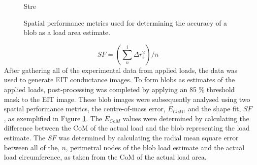 	\begin{figure}[H]Stre
		\centering
		\hspace{1cm}
		\vspace{0.2cm}
		\caption{Spatial performance metrics used for determining the accuracy of a blob as a load area estimate.}
		\label{fig:eg_spatial_metrics}
	\end{figure}
    \begin{equation}
        S\!F = \left( \sum^i_n \Delta r_i^2 \right) / n
        \label{eqn:sf}
    \end{equation}
	After gathering all of the experimental data from applied loads, the data was used to generate EIT conductance images. To form blobs as estimates of the applied loads, post-processing was completed by applying an 85 \% threshold mask to the EIT image. These blob images were subsequently analysed using two spatial performance metrics, the centre-of-mass error, $E_{CoM}$, and the shape fit, $S\!F$, as exemplified in Figure \ref{fig:eg_spatial_metrics}. The $E_{CoM}$ values were determined by calculating the difference between the CoM of the actual load and the blob representing the load estimate. The $S\!F$ was determined by calculating the radial mean square error between all of the, $n$, perimetral nodes of the blob load estimate and the actual load circumference, as taken from the CoM of the actual load area.

